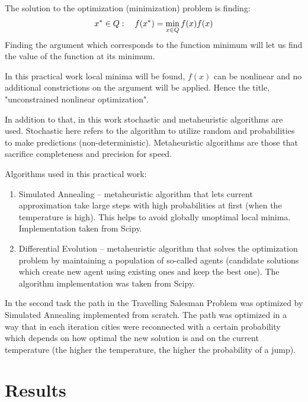 \documentclass[12pt, a4paper]{article}
\begin{document}
The solution to the optimization (minimization) problem is finding:
\[ x^* \in Q: \quad f(x^*) = \min_{x\in Q} f(x) \def \arg \min_{x\in Q} f(x) \]
Finding the argument which corresponds to the function minimum will let us find the value of the function at its minimum.

In this practical work local minima will be found, $f(x)$ can be nonlinear and no additional constrictions on the argument will be applied. Hence the title, "unconstrained nonlinear optimization".

In addition to that, in this work stochastic and metaheuristic algorithms are used. Stochastic here refers to the algorithm to utilize random and probabilities to make predictions (non-deterministic). Metaheuristic algorithms are those that sacrifice completeness and precision for speed.

Algorithms used in this practical work:
\begin{enumerate}
	\item Simulated Annealing -- metaheuristic algorithm that lets current approximation take large steps with high probabilities at first (when the temperature is high). This helps to avoid globally unoptimal local minima. Implementation taken from Scipy.
	\item Differential Evolution -- metaheuristic algorithm that solves the optimization problem by maintaining a population of so-called agents (candidate solutions which create new agent using existing ones and keep the best one). The algorithm implementation was taken from Scipy.
\end{enumerate}

In the second task the path in the Travelling Salesman Problem was optimized by Simulated Annealing implemented from scratch. The path was optimized in a way that in each iteration cities were reconnected with a certain probability which depends on how optimal the new solution is and on the current temperature (the higher the temperature, the higher the probability of a jump).

\newpage

\section*{Results}
\end{document}
